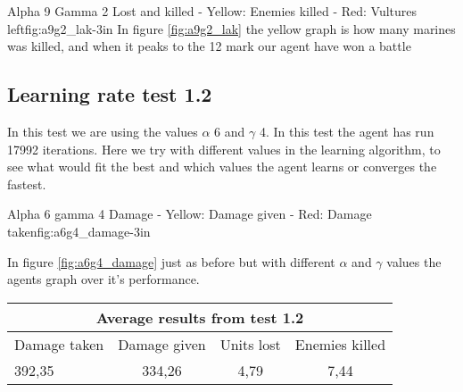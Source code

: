 




			{Alpha 9 Gamma 2 Lost and killed - Yellow: Enemies killed - Red: Vultures left}{fig:a9g2_lak}{-3in}
In figure \ref{fig:a9g2_lak} the yellow graph is how many marines was killed, and when it peaks to the 12 mark our agent have won a battle






\subsection*{Learning rate test 1.2}
In this test we are using the values $\alpha$ 6 and $\gamma$ 4. In this test the agent has run 17992 iterations. Here we try with different values in the learning algorithm, to see what would fit the best and which values the agent learns or converges the fastest.


			{Alpha 6 gamma 4 Damage - Yellow: Damage given - Red: Damage taken}{fig:a6g4_damage}{-3in}

In figure \ref{fig:a6g4_damage} just as before but with different $\alpha$ and $\gamma$ values the agents graph over it's performance.






\begin{centering}
 \begin{tabular}{|l||c|c|c|}
	\multicolumn{4}{c}{Average results from test 1.2} \\
	\hline
		Damage taken & Damage given & Units lost & Enemies killed\\
	\hline
		392,35 & 334,26 & 4,79 & 7,44 \\
	\hline

\end{tabular}
\end{centering}





